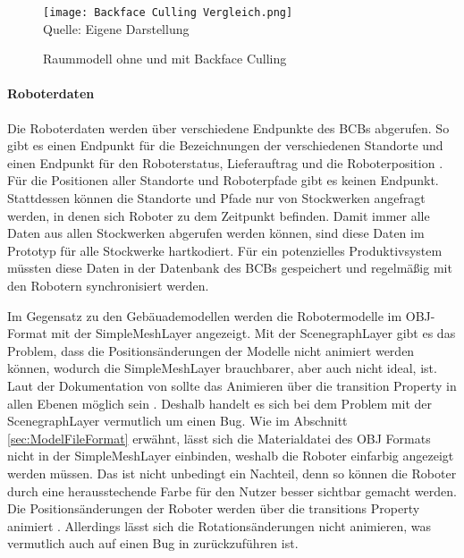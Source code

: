 \begin{figure}[H]
    \caption{Raummodell ohne und mit Backface Culling}\label{fig:BackfaceCulling}
    \texttt{[image: Backface Culling Vergleich.png]}
    \\
    Quelle: Eigene Darstellung
\end{figure}

\paragraph{Roboterdaten}\label{sec:RobotData}
Die Roboterdaten werden über verschiedene Endpunkte des \ac{BCB}s abgerufen. So gibt es einen Endpunkt für die Bezeichnungen der verschiedenen Standorte und einen Endpunkt für den Roboterstatus, Lieferauftrag und die Roboterposition \cite{BCBSwagger}. Für die Positionen aller Standorte und Roboterpfade gibt es keinen Endpunkt. Stattdessen können die Standorte und Pfade nur von Stockwerken angefragt werden, in denen sich Roboter zu dem Zeitpunkt befinden. Damit immer alle Daten aus allen Stockwerken abgerufen werden können, sind diese Daten im Prototyp für alle Stockwerke hartkodiert. Für ein potenzielles Produktivsystem müssten diese Daten in der Datenbank des \ac{BCB}s gespeichert und regelmäßig mit den Robotern synchronisiert werden.

Im Gegensatz zu den Gebäuademodellen werden die Robotermodelle im \ac{OBJ}-Format mit der SimpleMeshLayer \cite{DeckglSimpleMeshLayer} angezeigt. Mit der ScenegraphLayer gibt es das Problem, dass die Positionsänderungen der Modelle nicht animiert werden können, wodurch die SimpleMeshLayer brauchbarer, aber auch nicht ideal, ist. Laut der Dokumentation von \deckgl{} sollte das Animieren über die transition Property in allen Ebenen möglich sein \cite{DeckglLayerClass}. Deshalb handelt es sich bei dem Problem mit der ScenegraphLayer vermutlich um einen Bug. Wie im Abschnitt \ref{sec:ModelFileFormat} erwähnt, lässt sich die Materialdatei des \ac{OBJ} Formats nicht in der SimpleMeshLayer einbinden, weshalb die Roboter einfarbig angezeigt werden müssen. Das ist nicht unbedingt ein Nachteil, denn so können die Roboter durch eine herausstechende Farbe für den Nutzer besser sichtbar gemacht werden. Die Positionsänderungen der Roboter werden über die transitions Property animiert \cite{DeckglLayerClass}. Allerdings lässt sich die Rotationsänderungen nicht animieren, was vermutlich auch auf einen Bug in \deckgl{} zurückzuführen ist.

